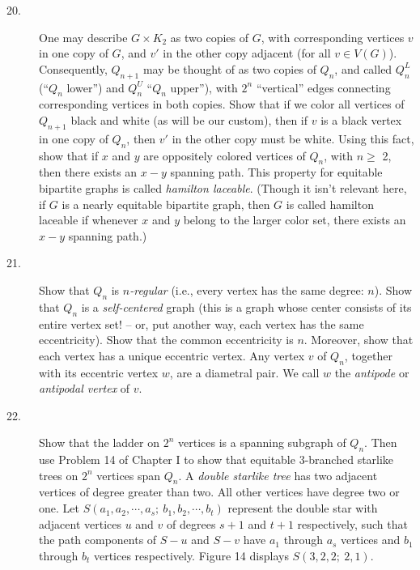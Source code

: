 \documentclass{article}
\begin{document}
\begin{description}
\item[20.] One may describe $G \times K_2$ as two copies of $G$, with corresponding vertices $v$ in one copy of $G$, and $v'$ in the other copy adjacent (for all $v \in V(G)$). Consequently, $Q_{n+1}$ may be thought of as two copies of $Q_n$, and called $Q^L_n$ (``$Q_n$ lower'') and $Q^U_n$ ``$Q_n$ upper''), with $2^n$ ``vertical'' edges connecting corresponding vertices in both copies. Show that if we color all vertices of $Q_{n+1}$ black and white (as will be our custom), then if $v$ is a black vertex in one copy of $Q_n$, then $v'$ in the other copy must be white. Using this fact, show that if $x$ and $y$ are oppositely colored vertices of $Q_n$, with $n \geq$ 2, then there exists an $x-y$ spanning path. This property for equitable bipartite graphs is called \emph{hamilton laceable}. (Though it isn't relevant here, if $G$ is a nearly equitable bipartite graph, then $G$ is called hamilton laceable if whenever $x$ and $y$ belong to the larger color set, there exists an $x-y$ spanning path.)

\item[21.] Show that $Q_n$ is \emph{$n$-regular} (i.e., every vertex has the same degree: $n$). Show that $Q_n$ is a \emph{self-centered} graph (this is a graph whose center consists of its entire vertex set! -- or, put another way, each vertex has the same eccentricity). Show that the common eccentricity is $n$. Moreover, show that each vertex has a unique eccentric vertex. Any vertex $v$ of $Q_n$, together with its eccentric vertex $w$, are a diametral pair. We call $w$ the \emph{antipode} or \emph{antipodal vertex} of $v$.

\item[22.] Show that the ladder on $2^n$ vertices is a spanning subgraph of $Q_n$. Then use Problem 14 of Chapter I to show that equitable $3$-branched starlike trees on $2^n$ vertices span $Q_n$. A \emph{double starlike tree} has two adjacent vertices of degree greater than two. All other vertices have degree two or one. Let $S(a_1,a_2,\cdots,a_s;\ b_1,b_2,\cdots,b_t)$ represent the double star with adjacent vertices $u$ and $v$ of degrees $s+1$ and $t+1$ respectively, such that the path components of $S-u$ and $S-v$ have $a_1$ through $a_s$ vertices and $b_1$ through $b_t$ vertices respectively. Figure 14 displays $S(3,2,2;\ 2,1)$.


\end{description}
\end{document}
